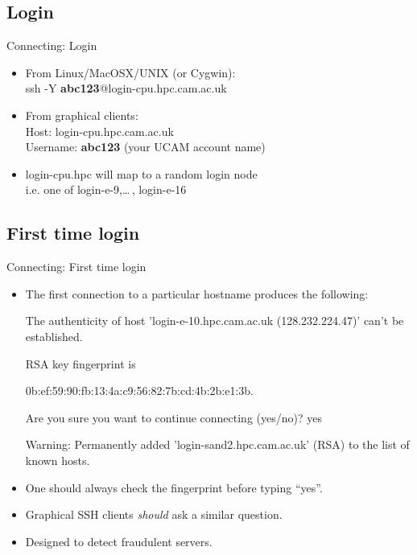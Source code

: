 \subsection{Login}
\begin{frame}{Connecting: Login}
\begin{itemize}
\item From Linux/MacOSX/UNIX (or Cygwin):\hfill\\
\alert{ssh -Y \textbf{abc123}@login-cpu.hpc.cam.ac.uk}
\pause
\item From graphical clients:\hfill\\
Host: \alert{login-cpu.hpc.cam.ac.uk}\hfill\\
Username: \alert{\textbf{abc123}} (your UCAM account name)
\pause
\item login-cpu.hpc will map to a random login node\hfill\\
\alert{i.e. one of login-e-9,\ldots\,, login-e-16}\hfill\\
\end{itemize}
\end{frame}

\subsection{First time login}
\begin{frame}{Connecting: First time login}
\begin{itemize}
\item{The first connection to a particular hostname produces the following:}
\begin{semiverbatim}\footnotesize
The authenticity of host 'login-e-10.hpc.cam.ac.uk  (128.232.224.47)' can't be established.

RSA key fingerprint is

{\color<2->{red}0b:ef:59:90:fb:13:4a:c9:56:82:7b:cd:4b:2b:e1:3b}.

Are you sure you want to continue connecting (yes/no)? {\color<3->{red}yes}

Warning: Permanently added 'login-sand2.hpc.cam.ac.uk' (RSA) to the list of known hosts.
\end{semiverbatim}
\smallskip\item{\alert{One should always check the fingerprint before typing ``yes''.}}
\item{Graphical SSH clients \emph{should} ask a similar question.}
\item{Designed to detect fraudulent servers.}
\end{itemize}
\end{frame}

